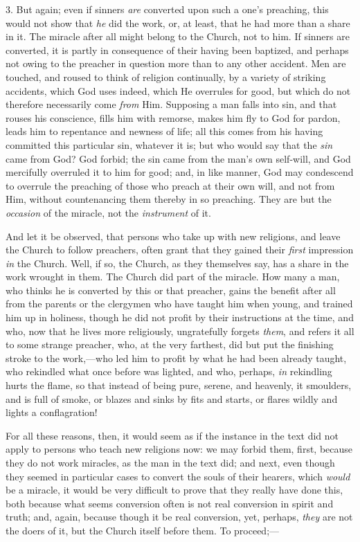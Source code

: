 3. But again; even if sinners \emph{are} converted upon such a
one's preaching, this would not show that \emph{he} did the work, or,
at least, that he had more than a share in it. The miracle after all
might belong to the Church, not to him. If sinners are converted, it
is partly in consequence of their having been baptized, and perhaps
not owing to the preacher in question more than to any other accident.
Men are touched, and roused to think of religion continually, by a
variety of striking accidents, which God uses indeed, which He
overrules for good, but which do not therefore necessarily come \emph{from}
Him. Supposing a man falls into sin, and that rouses his conscience,
fills him with remorse, makes him fly to God for pardon, leads him to
repentance and newness of life; all this comes from his having
committed this particular sin, whatever it is; but who would say that
the \emph{sin} came from God? God forbid; the sin came from the man's
own self-will, and God mercifully overruled it to him for good; and,
in like manner, God may condescend to overrule the preaching of those
who preach at their own will, and not from Him, without countenancing
them thereby in so preaching. They are but the \emph{occasion} of the
miracle, not the \emph{instrument} of it.

And let it be observed, that persons who take up with new
religions, and leave the Church to follow preachers, often grant that
they gained their \emph{first} impression \emph{in} the Church. Well,
if so, the Church, as they themselves say, has a share in the work
wrought in them. The Church did part of the miracle. How many a man,
who thinks he is converted by this or that preacher, gains the benefit
after all from the parents or the clergymen who have taught him when
young, and trained him up in holiness, though he did not profit by
their instructions at the time, and who, now that he lives more
religiously, ungratefully forgets \emph{them}, and refers it all to
some strange preacher, who, at the very farthest, did but put the
finishing stroke to the work,—who led him to profit by what he had
been already taught, who rekindled what once before was lighted, and
who, perhaps, \emph{in} rekindling hurts the flame, so that instead of
being pure, serene, and heavenly, it smoulders, and is full of smoke,
or blazes and sinks by fits and starts, or flares wildly and lights a
conflagration!

For all these reasons, then, it would seem as if the instance in
the text did not apply to persons who teach new religions now: we may
forbid them, first, because they do not work miracles, as the man in
the text did; and next, even though they seemed in particular cases to
convert the souls of their hearers, which \emph{would} be a miracle,
it would be very difficult to prove that they really have done this,
both because what seems conversion often is not real conversion in
spirit and truth; and, again, because though it be real conversion,
yet, perhaps, \emph{they} are not the doers of it, but the Church
itself before them. To proceed;—

